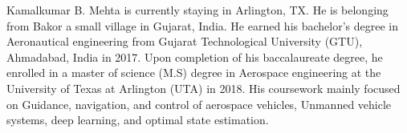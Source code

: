 Kamalkumar B. Mehta is currently staying in Arlington, TX. He is belonging from Bakor a small village in Gujarat, India. He earned his bachelor's degree in Aeronautical engineering from Gujarat Technological University (GTU), Ahmadabad, India in 2017. Upon completion of his baccalaureate degree, he enrolled in a master of science (M.S) degree in Aerospace engineering at the University of Texas at Arlington (UTA) in 2018. His coursework mainly focused on Guidance, navigation, and control of aerospace vehicles, Unmanned vehicle systems, deep learning, and optimal state estimation. 